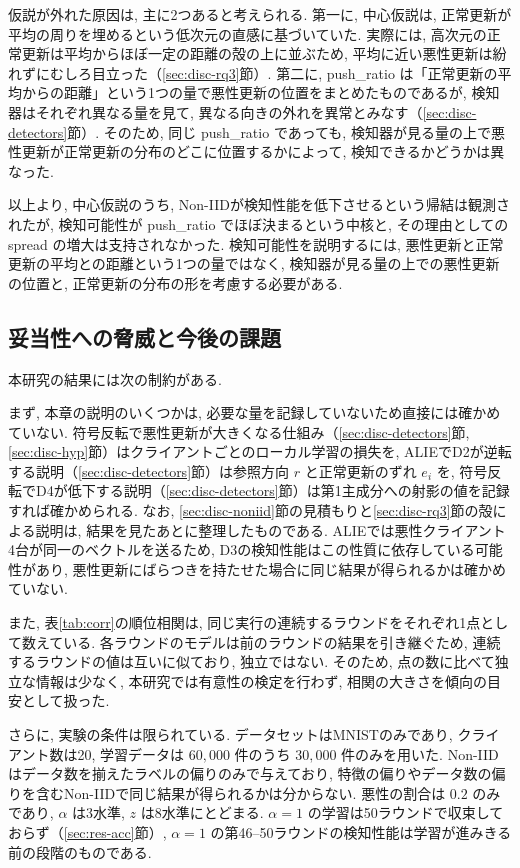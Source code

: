 \documentclass[a4j, twocolumn, dvipdfmx]{jsarticle}
\newcommand{\PushRatio}{\textrm{push\_ratio}}
\newcommand{\Spread}{\textrm{spread}}
\begin{document}
仮説が外れた原因は, 主に2つあると考えられる. 第一に, 中心仮説は, 正常更新が平均の周りを埋めるという低次元の直感に基づいていた. 実際には, 高次元の正常更新は平均からほぼ一定の距離の殻の上に並ぶため, 平均に近い悪性更新は紛れずにむしろ目立った（\ref{sec:disc-rq3}節）. 第二に, \PushRatio{} は「正常更新の平均からの距離」という1つの量で悪性更新の位置をまとめたものであるが, 検知器はそれぞれ異なる量を見て, 異なる向きの外れを異常とみなす（\ref{sec:disc-detectors}節）. そのため, 同じ \PushRatio{} であっても, 検知器が見る量の上で悪性更新が正常更新の分布のどこに位置するかによって, 検知できるかどうかは異なった.

以上より, 中心仮説のうち, Non-IIDが検知性能を低下させるという帰結は観測されたが, 検知可能性が \PushRatio{} でほぼ決まるという中核と, その理由としての \Spread{} の増大は支持されなかった. 検知可能性を説明するには, 悪性更新と正常更新の平均との距離という1つの量ではなく, 検知器が見る量の上での悪性更新の位置と, 正常更新の分布の形を考慮する必要がある.

\subsection{妥当性への脅威と今後の課題}
\label{sec:disc-threats}

本研究の結果には次の制約がある.

まず, 本章の説明のいくつかは, 必要な量を記録していないため直接には確かめていない. 符号反転で悪性更新が大きくなる仕組み（\ref{sec:disc-detectors}節, \ref{sec:disc-hyp}節）はクライアントごとのローカル学習の損失を, ALIEでD2が逆転する説明（\ref{sec:disc-detectors}節）は参照方向 $r$ と正常更新のずれ $e_i$ を, 符号反転でD4が低下する説明（\ref{sec:disc-detectors}節）は第1主成分への射影の値を記録すれば確かめられる. なお, \ref{sec:disc-noniid}節の見積もりと\ref{sec:disc-rq3}節の殻による説明は, 結果を見たあとに整理したものである. ALIEでは悪性クライアント4台が同一のベクトルを送るため, D3の検知性能はこの性質に依存している可能性があり, 悪性更新にばらつきを持たせた場合に同じ結果が得られるかは確かめていない.

また, 表\ref{tab:corr}の順位相関は, 同じ実行の連続するラウンドをそれぞれ1点として数えている. 各ラウンドのモデルは前のラウンドの結果を引き継ぐため, 連続するラウンドの値は互いに似ており, 独立ではない. そのため, 点の数に比べて独立な情報は少なく, 本研究では有意性の検定を行わず, 相関の大きさを傾向の目安として扱った.

さらに, 実験の条件は限られている. データセットはMNISTのみであり, クライアント数は20, 学習データは $60{,}000$ 件のうち $30{,}000$ 件のみを用いた. Non-IIDはデータ数を揃えたラベルの偏りのみで与えており, 特徴の偏りやデータ数の偏りを含むNon-IIDで同じ結果が得られるかは分からない. 悪性の割合は $0.2$ のみであり, $\alpha$ は3水準, $z$ は8水準にとどまる. $\alpha=1$ の学習は50ラウンドで収束しておらず（\ref{sec:res-acc}節）, $\alpha=1$ の第46--50ラウンドの検知性能は学習が進みきる前の段階のものである.
\end{document}
